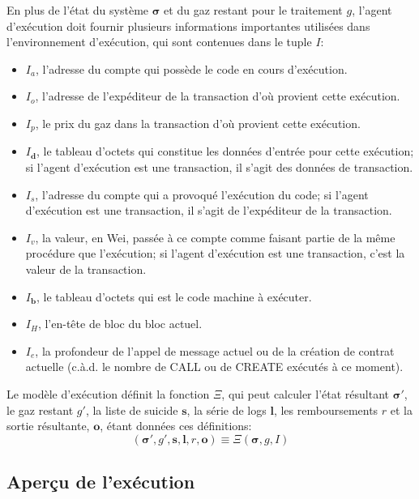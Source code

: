 \documentclass[9pt,oneside]{amsart}
\begin{document}
\begin{multicols}{2}
En plus de l'état du système $\boldsymbol{\sigma}$ et du gaz restant pour le traitement $g$, l'agent d'exécution doit fournir plusieurs informations importantes utilisées dans l'environnement d'exécution, qui sont contenues dans le tuple $I$:

\begin{itemize}
\item $I_a$, l'adresse du compte qui possède le code en cours d'exécution.
\item $I_o$, l'adresse de l'expéditeur de la transaction d'où provient cette exécution.
\item $I_p$, le prix du gaz dans la transaction d'où provient cette exécution.
\item $I_\mathbf{d}$, le tableau d'octets qui constitue les données d'entrée pour cette exécution; si l'agent d'exécution est une transaction, il s'agit des données de transaction.
\item $I_s$, l'adresse du compte qui a provoqué l'exécution du code; si l'agent d'exécution est une transaction, il s'agit de l'expéditeur de la transaction.
\item $I_v$, la valeur, en Wei, passée à ce compte comme faisant partie de la même procédure que l'exécution; si l'agent d'exécution est une transaction, c'est la valeur de la transaction.
\item $I_\mathbf{b}$, le tableau d'octets qui est le code machine à exécuter.
\item $I_H$, l'en-tête de bloc du bloc actuel.
\item $I_e$, la profondeur de l'appel de message actuel ou de la création de contrat actuelle (c.à.d. le nombre de {\small CALL} ou de {\small CREATE} exécutés à ce moment).
\end{itemize}

Le modèle d'exécution définit la fonction $\Xi$, qui peut calculer l'état résultant $\boldsymbol{\sigma}'$, le gaz restant $g'$, la liste de suicide $\mathbf{s}$, la série de logs $\mathbf{l}$, les remboursements $r$ et la sortie résultante, $\mathbf{o}$, étant données ces définitions:
\begin{equation}
(\boldsymbol{\sigma}', g', \mathbf{s}, \mathbf{l}, r, \mathbf{o}) \equiv \Xi(\boldsymbol{\sigma}, g, I)
\end{equation}

\subsection{Aperçu de l'exécution}


\end{multicols}
\end{document}
